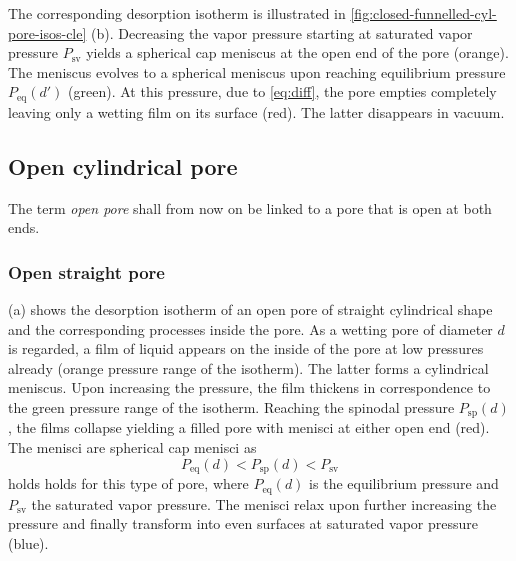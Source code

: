 \documentclass[../thesis.tex]{subfiles}
\begin{document}
                The corresponding desorption isotherm is illustrated in \cref{fig:closed-funnelled-cyl-pore-isos-cle} (b). Decreasing the vapor pressure starting at saturated vapor pressure $P_\mathrm{sv}$ yields a spherical cap meniscus at the open end of the pore (orange). The meniscus evolves to a spherical meniscus upon reaching equilibrium pressure $P_\mathrm{eq}(d')$ (green). At this pressure, due to \cref{eq:diff}, the pore empties completely leaving only a wetting film on its surface (red). The latter disappears in vacuum.

                
                
                
                
                


        \subsection{Open cylindrical pore}

            The term \textit{open pore} shall from now on be linked to a pore that is open at both ends.

            \subsubsection{Open straight pore}

                 (a) shows the desorption isotherm of an open pore of straight cylindrical shape and the corresponding processes inside the pore. As a wetting pore of diameter $d$ is regarded, a film of liquid appears on the inside of the pore at low pressures already (orange pressure range of the isotherm). The latter forms a cylindrical meniscus. Upon increasing the pressure, the film thickens in correspondence to the green pressure range of the isotherm. Reaching the spinodal pressure $P_\mathrm{sp}(d)$, the films collapse yielding a filled pore with menisci at either open end (red). The menisci are spherical cap menisci as
                \begin{equation}
                    P_\mathrm{eq}(d)<P_\mathrm{sp}(d)<P_\mathrm{sv}
                \end{equation}
                holds holds for this type of pore, where $P_\mathrm{eq}(d)$ is the equilibrium pressure and $P_\mathrm{sv}$ the saturated vapor pressure. The menisci relax upon further increasing the pressure and finally transform into even surfaces at saturated vapor pressure (blue).
                \medskip
\end{document}
